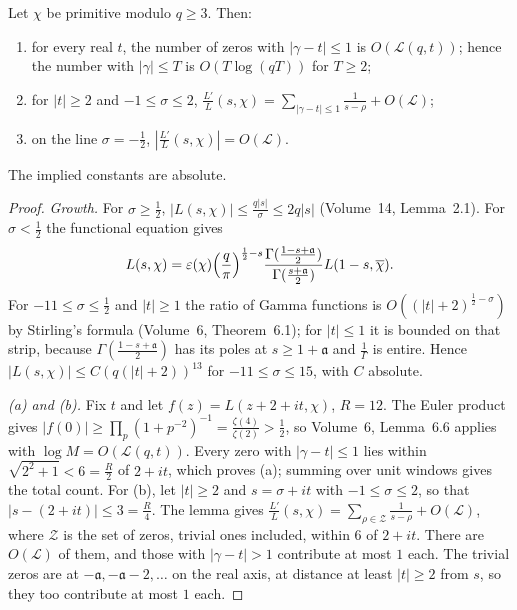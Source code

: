 \begin{lemma}\label{lem:localL}
Let $\chi$ be primitive modulo $q\ge3$. Then:
\begin{enumerate}[label=(\alph*)]
\item for every real $t$, the number of zeros with $|\gamma-t|\le1$ is $O(\mathcal L(q,t))$; hence the number with $|\gamma|\le T$ is $O(T\log(qT))$ for $T\ge2$;
\item for $|t|\ge2$ and $-1\le\sigma\le2$, $\frac{L'}L(s,\chi)=\sum_{|\gamma-t|\le1}\frac1{s-\rho}+O(\mathcal L)$;
\item on the line $\sigma=-\frac12$, $|\frac{L'}L(s,\chi)|=O(\mathcal L)$.
\end{enumerate}
The implied constants are absolute.
\end{lemma}
\begin{proof}
\emph{Growth.} For $\sigma\ge\frac12$, $|L(s,\chi)|\le\frac{q|s|}\sigma\le2q|s|$ (Volume~14, Lemma~2.1). For $\sigma<\frac12$ the functional equation gives
\[
L(s,\chi)=\varepsilon(\chi)\Bigl(\frac q\pi\Bigr)^{\frac12-s}\frac{\Gamma(\frac{1-s+\mathfrak a}2)}{\Gamma(\frac{s+\mathfrak a}2)}L(1-s,\overline\chi).
\]
For $-11\le\sigma\le\frac12$ and $|t|\ge1$ the ratio of Gamma functions is $O((|t|+2)^{\frac12-\sigma})$ by Stirling's formula (Volume~6, Theorem~6.1); for $|t|\le1$ it is bounded on that strip, because $\Gamma(\frac{1-s+\mathfrak a}2)$ has its poles at $s\ge1+\mathfrak a$ and $\frac1\Gamma$ is entire. Hence $|L(s,\chi)|\le C(q(|t|+2))^{13}$ for $-11\le\sigma\le15$, with $C$ absolute.

\emph{(a) and (b).} Fix $t$ and let $f(z)=L(z+2+it,\chi)$, $R=12$. The Euler product gives $|f(0)|\ge\prod_p(1+p^{-2})^{-1}=\frac{\zeta(4)}{\zeta(2)}>\frac12$, so Volume~6, Lemma~6.6 applies with $\log M=O(\mathcal L(q,t))$. Every zero with $|\gamma-t|\le1$ lies within $\sqrt{2^2+1}<6=\frac R2$ of $2+it$, which proves (a); summing over unit windows gives the total count. For (b), let $|t|\ge2$ and $s=\sigma+it$ with $-1\le\sigma\le2$, so that $|s-(2+it)|\le3=\frac R4$. The lemma gives $\frac{L'}L(s,\chi)=\sum_{\rho\in\mathcal Z}\frac1{s-\rho}+O(\mathcal L)$, where $\mathcal Z$ is the set of zeros, trivial ones included, within $6$ of $2+it$. There are $O(\mathcal L)$ of them, and those with $|\gamma-t|>1$ contribute at most $1$ each. The trivial zeros are at $-\mathfrak a,-\mathfrak a-2,\dots$ on the real axis, at distance at least $|t|\ge2$ from $s$, so they too contribute at most $1$ each.


\end{proof}
